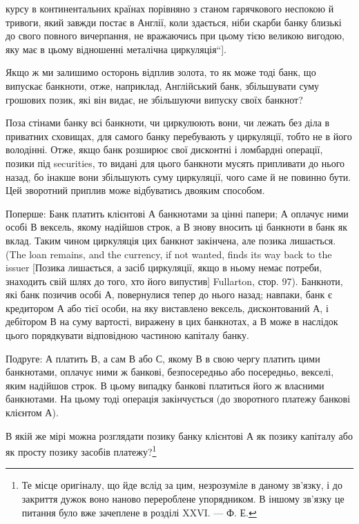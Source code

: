 \parcont{}  %
курсу в континентальних країнах порівняно з станом гарячкового
неспокою й тривоги, який завжди постає в Англії, коли
здається, ніби скарби банку близькі до свого повного вичерпання,
не вражаючись при цьому тією великою вигодою, яку
має в цьому відношенні металічна циркуляція“].

Якщо ж ми залишимо осторонь відплив золота, то як може
тоді банк, що випускає банкноти, отже, наприклад, Англійський
банк, збільшувати суму грошових позик, які він видає, не збільшуючи
випуску своїх банкнот?

Поза стінами банку всі банкноти, чи циркулюють вони, чи
лежать без діла в приватних сховищах, для самого банку перебувають
у циркуляції, тобто не в його володінні. Отже, якщо
банк розширює свої дисконтні і ломбардні операції, позики під
securities, то видані для цього банкноти мусять припливати до
нього назад, бо інакше вони збільшують суму циркуляції, чого
саме й не повинно бути. Цей зворотний приплив може відбуватись
двояким способом.

Поперше: Банк платить клієнтові А банкнотами за цінні папери;
А оплачує ними особі В вексель, якому надійшов строк,
а В знову вносить ці банкноти в банк як вклад. Таким чином
циркуляція цих банкнот закінчена, але позика лишається. (The
loan remains, and the currency, if not wanted, finds its way back
to the issuer [Позика лишається, а засіб циркуляції, якщо в ньому
немає потреби, знаходить свій шлях до того, хто його випустив]
Fullarton, стор. 97). Банкноти, які банк позичив особі А, повернулися
тепер до нього назад; навпаки, банк є кредитором А
або тієї особи, на яку виставлено вексель, дисконтований А,
і дебітором В на суму вартості, виражену в цих банкнотах,
а В може в наслідок цього порядкувати відповідною частиною
капіталу банку.

Подруге: А платить В, а сам В або С, якому В в свою чергу
платить цими банкнотами, оплачує ними ж банкові, безпосередньо
або посередньо, векселі, яким надійшов строк. В цьому
випадку банкові платиться його ж власними банкнотами. На
цьому тоді операція закінчується (до зворотного платежу банкові
клієнтом А).

В якій же мірі можна розглядати позику банку клієнтові А
як позику капіталу або як просту позику засобів платежу?\footnote{
Те місце оригіналу, що йде вслід за цим, незрозуміле в даному зв’язку,
і до закриття дужок воно наново перероблене упорядником. В іншому зв’язку
це питання було вже зачеплене в розділі XXVI. — Ф. Е.
}


